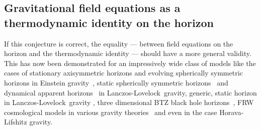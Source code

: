 \documentclass[12pt]{iopart}
\newcommand{\LL}{Lanczos-Lovelock}
\begin{document}
\subsection{Gravitational field equations as a thermodynamic identity on the horizon}\label{sec:gravthermoiden}

If this conjecture is correct, the equality --- between field equations on the horizon and the thermodynamic identity --- should have a more general validity. This has now been demonstrated for an impressively wide class of models 
like the cases of stationary
axisymmetric horizons and evolving spherically symmetric horizons
in Einstein gravity~\cite{KSP}, static spherically symmetric
horizons~\cite{KP} and dynamical apparent horizons~\cite{CCHK} in
\LL\ gravity, 
generic, static horizon in \LL\ gravity \cite{tpdawoodgentds},
 three dimensional BTZ black hole
horizons~\cite{Akbar1}, FRW cosmological
models in various gravity
theories~\cite{CK,AC07,CC2,AC1,AC,CC1,GW,Others1,CCH} and even in  \cite{hwg}  the case Horava-Lifshitz gravity.
\end{document}
